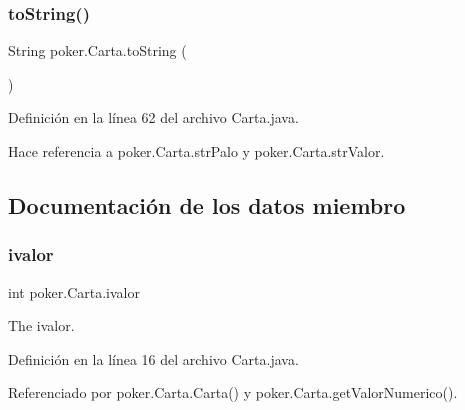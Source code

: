 \subsubsection{\texorpdfstring{toString()}{toString()}}
{\footnotesize\ttfamily String poker.\+Carta.\+to\+String (\begin{DoxyParamCaption}{ }\end{DoxyParamCaption})}



Definición en la línea 62 del archivo Carta.\+java.


\begin{DoxyCode}{0}

\end{DoxyCode}


Hace referencia a poker.\+Carta.\+str\+Palo y poker.\+Carta.\+str\+Valor.



\subsection{Documentación de los datos miembro}
\mbox{\label{classpoker_1_1Carta_ac4748f23289d9b1bfc87e3899b656d8d}} 
\subsubsection{\texorpdfstring{ivalor}{ivalor}}
{\footnotesize\ttfamily int poker.\+Carta.\+ivalor\hspace{0.3cm}{\ttfamily [private]}}



The ivalor. 



Definición en la línea 16 del archivo Carta.\+java.



Referenciado por poker.\+Carta.\+Carta() y poker.\+Carta.\+get\+Valor\+Numerico().

\mbox{\label{classpoker_1_1Carta_a819422a523ac0469a2cce6801bc9ee85}} 
